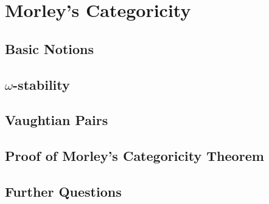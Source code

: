 \documentclass[10pt]{report}
\theoremstyle{definition}
\begin{document}






\chapter{Morley's Categoricity}

\section{Basic Notions}



\section{\(\omega\)-stability}


\section{Vaughtian Pairs}


\section{Proof of Morley's Categoricity Theorem}


\section{Further Questions}


%
\end{document}
